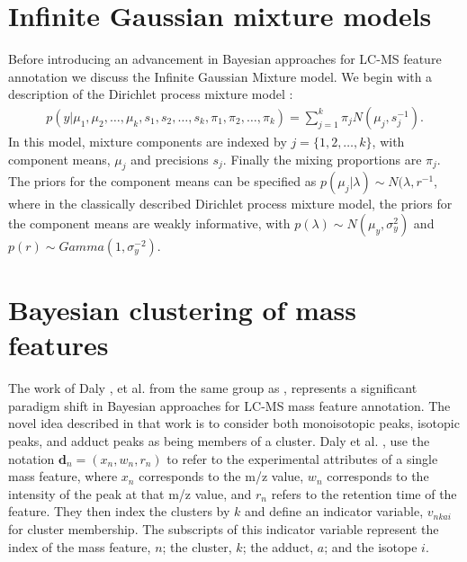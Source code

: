 \begin{DoubleSpace*}
\section{Infinite Gaussian mixture models}
Before introducing an advancement in Bayesian approaches for LC-MS feature annotation we discuss the Infinite Gaussian Mixture model. We begin with a description of the Dirichlet process mixture model \cite{ferguson1973}: 
\begin{align}
p(y|\mu_1,\mu_2, \hdots, \mu_k, s_1, s_2, \hdots, s_k, \pi_1, \pi_2, \hdots, \pi_k) = \sum_{j=1}^{k} \pi_j N(\mu_j,s_j^{-1}).
\end{align}
In this model, mixture components are indexed by $j=\{1,2, \hdots,k\}$, with component means, $\mu_j$ and precisions $s_j$. Finally the mixing proportions are $\pi_j$. The priors for the component means can be specified as $p(\mu_j|\lambda) \sim N(\lambda, r^{-1}$, where in the classically described Dirichlet process mixture model, the priors for the component means are weakly informative, with $p(\lambda)\sim N(\mu_y,\sigma_y^2)$ and $p(r)\sim Gamma(1,\sigma_y^{-2})$.

\cite{rasmussen1999}

\section{Bayesian clustering of mass features}
The work of Daly \cite{daly2014}, et al. from the same group as \cite{rogers2009}, represents a significant paradigm shift in Bayesian approaches for LC-MS mass feature annotation. The novel idea described in that work is to consider both monoisotopic peaks, isotopic peaks, and adduct peaks as being members of a cluster. Daly et al. \cite{daly2014}, use the notation $\textbf{d}_n = (x_n,w_n,r_n)$ to refer to the experimental attributes of a single mass feature, where $x_n$ corresponds to the m/z value, $w_n$ corresponds to the intensity of the peak at that m/z value, and $r_n$ refers to the retention time of the feature. They then index the clusters by $k$ and define an indicator variable, $v_{nkai}$ for cluster membership. The subscripts of this indicator variable represent the index of the mass feature, $n$; the cluster, $k$; the adduct, $a$; and the isotope $i$. 

\end{DoubleSpace*}